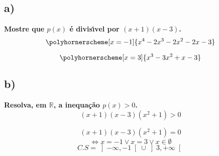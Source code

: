\documentclass[a4paper]{article}
\begin{document}
	\subsection*{a)}\textbf{Mostre que $p(x)$ é divisı́vel por $(x + 1)(x - 3)$.}
	\[\polyhornerscheme[x=-1]{x^4-2x^3-2x^2-2x-3}\]
	
	\[\polyhornerscheme[x=3]{x^3-3x^2+x-3}\]
	\subsection*{b)}\textbf{Resolva, em $\mathbb{R}$, a inequação $p(x) > 0$.}
	\[\text{$\left(x+1\right)\left(x-3\right)\left(x^2+1\right)>0$}\]
	
	\[\text{$\left(x+1\right)\left(x-3\right)\left(x^2+1\right)=0$}\]
	\[\Leftrightarrow x=-1 \lor x=3 \lor x \in \emptyset \]
	\[C.S=\left]-\infty,-1\right[\cup \left]3,+\infty\right[\]
\end{document}
